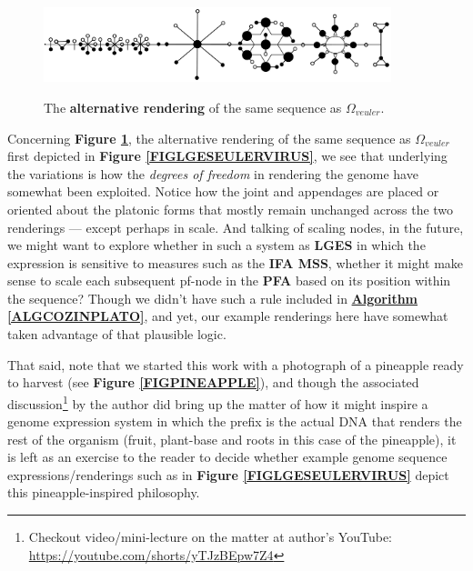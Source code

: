 \documentclass[a4paper, 18pt]{book} %
\begin{document}
\begin{figure}[H]
  \begin{center}
   \includegraphics[trim=0cm 0cm 0cm 0cm, clip, width=0.9\textwidth,]{resources/pdfs/v2-PLATONIC-EULERVIRUS-landscape.pdf}\\
   \caption{The \textbf{alternative rendering}  of the same sequence as $\Omega_{veuler}$.}
  \label{FIGLGESEULERVIRUSv2}
  \end{center}
\end{figure}

Concerning \textbf{Figure \ref{FIGLGESEULERVIRUSv2}}, the alternative rendering  of the same sequence as $\Omega_{veuler}$ first depicted in \textbf{Figure \ref{FIGLGESEULERVIRUS}}, we see that underlying the variations is how the \textit{degrees of freedom} in rendering the genome have somewhat been exploited. Notice how the joint and appendages are placed or oriented about the platonic forms that mostly remain unchanged across the two renderings --- except perhaps in scale. And talking of scaling nodes, in the future, we might want to explore whether in such a system as \textbf{LGES} in which the expression is sensitive to measures such as the \textbf{IFA MSS}, whether it might make sense to scale each subsequent pf-node in the \textbf{PFA} based on its position within the sequence? Though we didn't have such a rule included in \textbf{\hyperref[ALGCOZINPLATO]{Algorithm \ref{ALGCOZINPLATO}}}, and yet, our example renderings here have somewhat taken advantage of that plausible logic.

That said, note that we started this work with a photograph of a pineapple ready to harvest (see \textbf{Figure \ref{FIGPINEAPPLE}}), and though the associated discussion\footnote{Checkout video/mini-lecture on the matter at author's YouTube: \url{https://youtube.com/shorts/yTJzBEpw7Z4}} by the author did bring up the matter of how it might inspire a genome expression system in which the prefix is the actual DNA that renders the rest of the organism (fruit, plant-base and roots in this case of the pineapple), it is left as an exercise to the reader to decide whether example genome sequence expressions/renderings such as in \textbf{Figure \ref{FIGLGESEULERVIRUS}} depict this pineapple-inspired philosophy.
\end{document}
